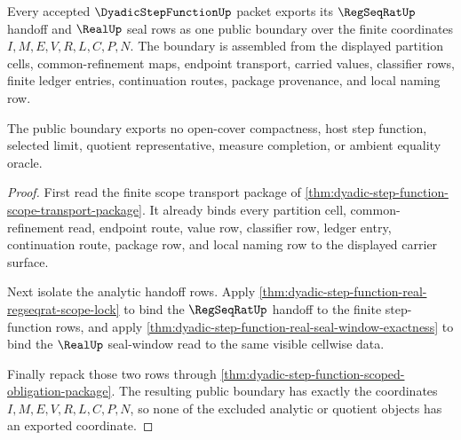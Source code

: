 \begin{theorem}
\label{thm:dyadic-step-function-real-seal-public-boundary}
Every accepted $\DyadicStepFunctionUp$ packet exports its $\RegSeqRatUp$ handoff and $\RealUp$ seal rows as one public boundary over the finite coordinates $I,M,E,V,R,L,C,P,N$. The boundary is assembled from the displayed partition cells, common-refinement maps, endpoint transport, carried values, classifier rows, finite ledger entries, continuation routes, package provenance, and local naming row.

The public boundary exports no open-cover compactness, host step function, selected limit, quotient representative, measure completion, or ambient equality oracle.
\end{theorem}
\begin{proof}
First read the finite scope transport package of \autoref{thm:dyadic-step-function-scope-transport-package}. It already binds every partition cell, common-refinement read, endpoint route, value row, classifier row, ledger entry, continuation route, package row, and local naming row to the displayed carrier surface.

Next isolate the analytic handoff rows. Apply \autoref{thm:dyadic-step-function-real-regseqrat-scope-lock} to bind the $\RegSeqRatUp$ handoff to the finite step-function rows, and apply \autoref{thm:dyadic-step-function-real-seal-window-exactness} to bind the $\RealUp$ seal-window read to the same visible cellwise data.

Finally repack those two rows through \autoref{thm:dyadic-step-function-scoped-obligation-package}. The resulting public boundary has exactly the coordinates $I,M,E,V,R,L,C,P,N$, so none of the excluded analytic or quotient objects has an exported coordinate.
\end{proof}

